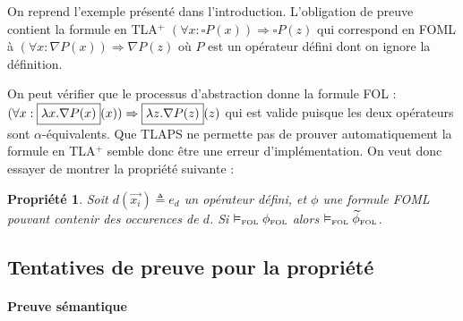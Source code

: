 \documentclass[12pt]{article}
\newcommand{\FOL}{\ensuremath{\textup{\tiny{}FOL}}}
\newtheorem{prop}{Propriété}
\begin{document}
On reprend l'exemple présenté dans l'introduction.
L'obligation de preuve contient la formule en TLA$^+$ $(\forall x : \square P(x)) \Rightarrow \square P(z)$ qui correspond en FOML à $(\forall x : \nabla P(x)) \Rightarrow \nabla P(z)$ où $P$ est un opérateur défini dont on ignore la définition.

On peut vérifier que le processus d'abstraction donne la formule FOL :
\( (\forall x : \fbox{$\lambda x . \nabla P(x)$}(x)) \Rightarrow \fbox{$\lambda z . \nabla P(z)$}(z) \)
qui est valide puisque les deux opérateurs sont $\alpha$-équivalents.
Que TLAPS ne permette pas de prouver automatiquement la formule en TLA$^+$ semble donc être une erreur d'implémentation.
On veut donc essayer de montrer la propriété suivante :

\begin{prop}
  \label{prop_sem}
Soit $d(\vec{x_i}) \triangleq e_d$ un opérateur défini, et $\phi$ une formule FOML pouvant contenir des occurences de $d$.
Si $\vDash_\FOL \phi_\FOL$ alors $\vDash_\FOL \widetilde{\phi}_\FOL$.
\end{prop}

\subsection{Tentatives de preuve pour la propriété}

\paragraph{Preuve sémantique}
\end{document}
